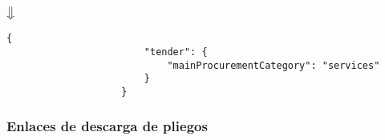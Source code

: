 \begin{itemize}
                \begin{center}
                    $\big\Downarrow$
                \end{center}
                
                \begin{lstlisting}[language=lJSON]
                    {
                        "tender": {
                            "mainProcurementCategory": "services"
                        }
                    }
                \end{lstlisting}
        \end{itemize}
        
        \subsubsection{Enlaces de descarga de pliegos}
